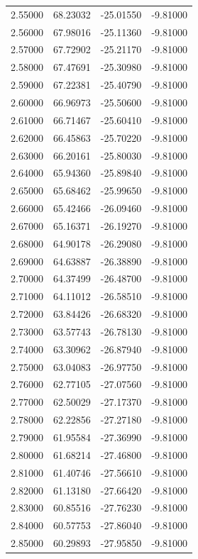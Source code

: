 \begin{table}
\begin{tabular}{llll}
2.55000 & 68.23032 & -25.01550 & -9.81000 \\
2.56000 & 67.98016 & -25.11360 & -9.81000 \\
2.57000 & 67.72902 & -25.21170 & -9.81000 \\
2.58000 & 67.47691 & -25.30980 & -9.81000 \\
2.59000 & 67.22381 & -25.40790 & -9.81000 \\
2.60000 & 66.96973 & -25.50600 & -9.81000 \\
2.61000 & 66.71467 & -25.60410 & -9.81000 \\
2.62000 & 66.45863 & -25.70220 & -9.81000 \\
2.63000 & 66.20161 & -25.80030 & -9.81000 \\
2.64000 & 65.94360 & -25.89840 & -9.81000 \\
2.65000 & 65.68462 & -25.99650 & -9.81000 \\
2.66000 & 65.42466 & -26.09460 & -9.81000 \\
2.67000 & 65.16371 & -26.19270 & -9.81000 \\
2.68000 & 64.90178 & -26.29080 & -9.81000 \\
2.69000 & 64.63887 & -26.38890 & -9.81000 \\
2.70000 & 64.37499 & -26.48700 & -9.81000 \\
2.71000 & 64.11012 & -26.58510 & -9.81000 \\
2.72000 & 63.84426 & -26.68320 & -9.81000 \\
2.73000 & 63.57743 & -26.78130 & -9.81000 \\
2.74000 & 63.30962 & -26.87940 & -9.81000 \\
2.75000 & 63.04083 & -26.97750 & -9.81000 \\
2.76000 & 62.77105 & -27.07560 & -9.81000 \\
2.77000 & 62.50029 & -27.17370 & -9.81000 \\
2.78000 & 62.22856 & -27.27180 & -9.81000 \\
2.79000 & 61.95584 & -27.36990 & -9.81000 \\
2.80000 & 61.68214 & -27.46800 & -9.81000 \\
2.81000 & 61.40746 & -27.56610 & -9.81000 \\
2.82000 & 61.13180 & -27.66420 & -9.81000 \\
2.83000 & 60.85516 & -27.76230 & -9.81000 \\
2.84000 & 60.57753 & -27.86040 & -9.81000 \\
2.85000 & 60.29893 & -27.95850 & -9.81000 \\

\end{tabular}
\end{table}
